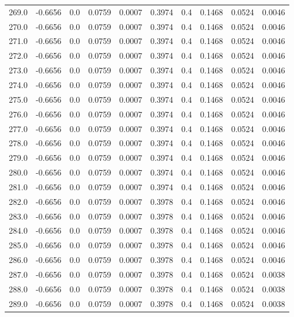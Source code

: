 \begin{longtable}{lrrrrrrrrr}
269.0 & -0.6656 & 0.0 & 0.0759 & 0.0007 & 0.3974 & 0.4 & 0.1468 & 0.0524 & 0.0046 \\
270.0 & -0.6656 & 0.0 & 0.0759 & 0.0007 & 0.3974 & 0.4 & 0.1468 & 0.0524 & 0.0046 \\
271.0 & -0.6656 & 0.0 & 0.0759 & 0.0007 & 0.3974 & 0.4 & 0.1468 & 0.0524 & 0.0046 \\
272.0 & -0.6656 & 0.0 & 0.0759 & 0.0007 & 0.3974 & 0.4 & 0.1468 & 0.0524 & 0.0046 \\
273.0 & -0.6656 & 0.0 & 0.0759 & 0.0007 & 0.3974 & 0.4 & 0.1468 & 0.0524 & 0.0046 \\
274.0 & -0.6656 & 0.0 & 0.0759 & 0.0007 & 0.3974 & 0.4 & 0.1468 & 0.0524 & 0.0046 \\
275.0 & -0.6656 & 0.0 & 0.0759 & 0.0007 & 0.3974 & 0.4 & 0.1468 & 0.0524 & 0.0046 \\
276.0 & -0.6656 & 0.0 & 0.0759 & 0.0007 & 0.3974 & 0.4 & 0.1468 & 0.0524 & 0.0046 \\
277.0 & -0.6656 & 0.0 & 0.0759 & 0.0007 & 0.3974 & 0.4 & 0.1468 & 0.0524 & 0.0046 \\
278.0 & -0.6656 & 0.0 & 0.0759 & 0.0007 & 0.3974 & 0.4 & 0.1468 & 0.0524 & 0.0046 \\
279.0 & -0.6656 & 0.0 & 0.0759 & 0.0007 & 0.3974 & 0.4 & 0.1468 & 0.0524 & 0.0046 \\
280.0 & -0.6656 & 0.0 & 0.0759 & 0.0007 & 0.3974 & 0.4 & 0.1468 & 0.0524 & 0.0046 \\
281.0 & -0.6656 & 0.0 & 0.0759 & 0.0007 & 0.3974 & 0.4 & 0.1468 & 0.0524 & 0.0046 \\
282.0 & -0.6656 & 0.0 & 0.0759 & 0.0007 & 0.3978 & 0.4 & 0.1468 & 0.0524 & 0.0046 \\
283.0 & -0.6656 & 0.0 & 0.0759 & 0.0007 & 0.3978 & 0.4 & 0.1468 & 0.0524 & 0.0046 \\
284.0 & -0.6656 & 0.0 & 0.0759 & 0.0007 & 0.3978 & 0.4 & 0.1468 & 0.0524 & 0.0046 \\
285.0 & -0.6656 & 0.0 & 0.0759 & 0.0007 & 0.3978 & 0.4 & 0.1468 & 0.0524 & 0.0046 \\
286.0 & -0.6656 & 0.0 & 0.0759 & 0.0007 & 0.3978 & 0.4 & 0.1468 & 0.0524 & 0.0046 \\
287.0 & -0.6656 & 0.0 & 0.0759 & 0.0007 & 0.3978 & 0.4 & 0.1468 & 0.0524 & 0.0038 \\
288.0 & -0.6656 & 0.0 & 0.0759 & 0.0007 & 0.3978 & 0.4 & 0.1468 & 0.0524 & 0.0038 \\
289.0 & -0.6656 & 0.0 & 0.0759 & 0.0007 & 0.3978 & 0.4 & 0.1468 & 0.0524 & 0.0038 \\

\end{longtable}
